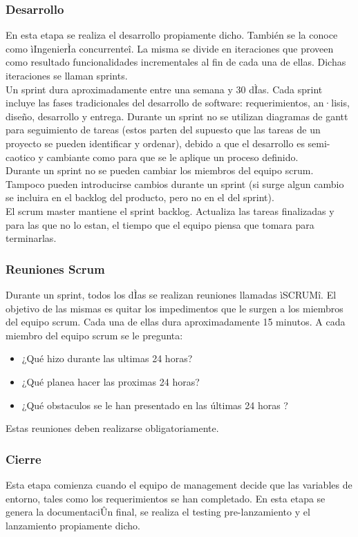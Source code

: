 \documentclass[preprint,12pt]{elsarticle}
\begin{document}
\subsubsection{\textbf{Desarrollo}}
En esta etapa se realiza el desarrollo propiamente dicho. También se la conoce como ìIngenierÌa concurrenteî. La misma se divide en iteraciones que proveen como resultado funcionalidades incrementales al fin de cada una de ellas. Dichas iteraciones se llaman sprints. \\
Un sprint dura aproximadamente entre una semana y 30 dÌas. Cada sprint incluye las fases tradicionales del desarrollo de software: requerimientos, an·lisis, diseño, desarrollo y entrega.
Durante un sprint no se utilizan diagramas de gantt para seguimiento de tareas (estos parten del supuesto que las tareas de un proyecto se pueden identificar y ordenar), debido a que el desarrollo es semi-caotico y cambiante como para que se le aplique un proceso definido. \\
Durante un sprint no se pueden cambiar los miembros del equipo scrum. Tampoco pueden introducirse cambios durante un sprint (si surge algun cambio se incluira en el backlog del producto, pero no en el del sprint). \\
El scrum master mantiene el sprint backlog. Actualiza las tareas finalizadas y para las que no lo estan, el tiempo que el equipo piensa que tomara para terminarlas. \cite{ScrumDef} \\

\subsubsection{\textbf{Reuniones Scrum}}
Durante un sprint, todos los dÌas se realizan reuniones llamadas ìSCRUMî. El objetivo de las mismas es quitar los impedimentos que le surgen a los miembros del equipo scrum. Cada una de ellas dura aproximadamente 15 minutos. A cada miembro del equipo scrum se le pregunta:
\begin{itemize}
\item ¿Qué hizo durante las ultimas 24 horas?
\item ¿Qué planea hacer las proximas 24 horas?
\item ¿Qué obstaculos se le han presentado en las últimas 24 horas ?
\end{itemize}
Estas reuniones deben realizarse obligatoriamente.\cite{ScrumDef}

\subsubsection{\textbf{Cierre}}
Esta etapa comienza cuando el equipo de management decide que las variables de entorno, tales como los requerimientos se han completado. En esta etapa se genera la documentaciÛn final, se realiza el testing pre-lanzamiento y el lanzamiento propiamente dicho. \cite{ScrumDef}
\end{document}
